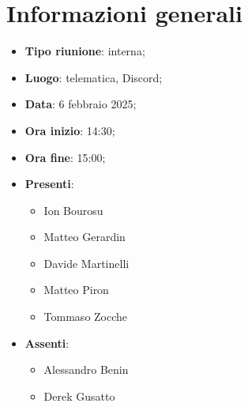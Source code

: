 \section{Informazioni generali}
\begin{itemize}
  \item \textbf{Tipo riunione}: interna;
  \item \textbf{Luogo}: telematica, Discord;
  \item \textbf{Data}: 6 febbraio 2025;
  \item \textbf{Ora inizio}: 14:30;
  \item \textbf{Ora fine}: 15:00;
  
  \item \textbf{Presenti}:
  \begin{itemize}
    \item Ion Bourosu
    \item Matteo Gerardin
    \item Davide Martinelli
    \item Matteo Piron
    \item Tommaso Zocche
  \end{itemize}

  \item \textbf{Assenti}:
  \begin{itemize}
    \item Alessandro Benin
    \item Derek Gusatto
  \end{itemize}
 
\end{itemize}